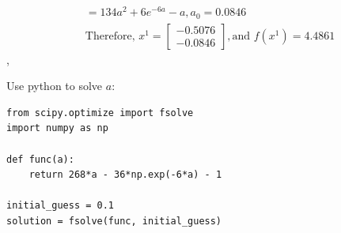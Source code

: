 \documentclass[12pt]{article}
\begin{document}
\begin{enumerate}
\begin{enumerate}
\begin{itemize}
\begin{align*}
                                           & = 134a^2+6e^{-6a}-a, a_0=0.0846                                        \\
                                           & \text{Therefore, } x^1 = \begin{bmatrix}
                                                                            -0.5076 \\
                                                                            -0.0846
                                                                      \end{bmatrix}, \text{and }f(x^1) = 4.4861
                                    \end{align*},

                        \end{itemize}
                        Use python to solve $a$:
                        \begin{lstlisting}
from scipy.optimize import fsolve
import numpy as np

def func(a):
    return 268*a - 36*np.exp(-6*a) - 1

initial_guess = 0.1
solution = fsolve(func, initial_guess)


\end{lstlisting}
\end{enumerate}
\end{enumerate}
\end{document}
